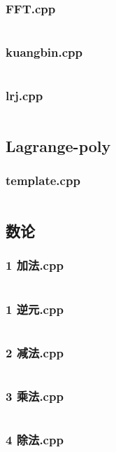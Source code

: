 \documentclass{article}
\begin{document}
\subsubsection{FFT.cpp}
\inputminted{c++}{/home/zzuzxy/t2/ACM-template/4 数学/FFT/FFT.cpp}
\subsubsection{kuangbin.cpp}
\inputminted{c++}{/home/zzuzxy/t2/ACM-template/4 数学/FFT/kuangbin.cpp}
\subsubsection{lrj.cpp}
\inputminted{c++}{/home/zzuzxy/t2/ACM-template/4 数学/FFT/lrj.cpp}
\subsection{Lagrange-poly}
\subsubsection{template.cpp}
\inputminted{c++}{/home/zzuzxy/t2/ACM-template/4 数学/Lagrange-poly/template.cpp}
\subsection{数论}
\subsubsection{1 加法.cpp}
\inputminted{c++}{/home/zzuzxy/t2/ACM-template/4 数学/数论/1 加法.cpp}
\subsubsection{1 逆元.cpp}
\inputminted{c++}{/home/zzuzxy/t2/ACM-template/4 数学/数论/1 逆元.cpp}
\subsubsection{2 减法.cpp}
\inputminted{c++}{/home/zzuzxy/t2/ACM-template/4 数学/数论/2 减法.cpp}
\subsubsection{3 乘法.cpp}
\inputminted{c++}{/home/zzuzxy/t2/ACM-template/4 数学/数论/3 乘法.cpp}
\subsubsection{4 除法.cpp}
\inputminted{c++}{/home/zzuzxy/t2/ACM-template/4 数学/数论/4 除法.cpp}
\end{document}
